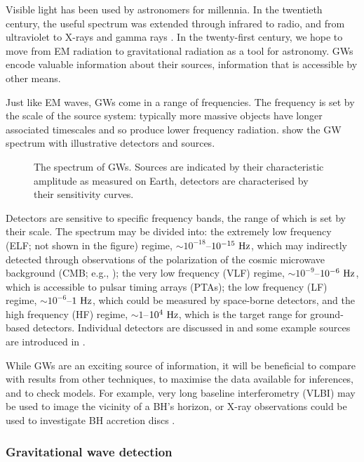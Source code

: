 Visible light has been used by astronomers for millennia. In the twentieth century, the useful spectrum was extended through infrared to radio, and from ultraviolet to X-rays and gamma rays \citep[chapter 7]{Longair2006}. In the twenty-first century, we hope to move from EM radiation to gravitational radiation as a tool for astronomy. GWs encode valuable information about their sources, information that is accessible by other means.

Just like EM waves, GWs come in a range of frequencies. The frequency is set by the scale of the source system: typically more massive objects have longer associated timescales and so produce lower frequency radiation.  show the GW spectrum with illustrative detectors and sources.
\begin{figure}
  \begin{center}
    \caption{The spectrum of GWs. Sources are indicated by their characteristic amplitude as measured on Earth, detectors are characterised by their sensitivity curves.}   
    \label{fig:spectrum} 
  \end{center}
\end{figure}
Detectors are sensitive to specific frequency bands, the range of which is set by their scale. The spectrum may be divided into: the extremely low frequency (ELF; not shown in the figure) regime, $\sim10^{-18}$--$10^{-15}~\mathrm{Hz}$, which may indirectly detected through observations of the polarization of the cosmic microwave background (CMB; e.g., \citealt{Hu1997,Kamionkowski1997}); the very low frequency (VLF) regime, $\sim10^{-9}$--$10^{-6}~\mathrm{Hz}$, which is accessible to pulsar timing arrays (PTAs); the low frequency (LF) regime, $\sim10^{-6}$--$1~\mathrm{Hz}$, which could be measured by space-borne detectors, and the high frequency (HF) regime, $\sim1$--$10^4~\mathrm{Hz}$, which is the target range for ground-based detectors. Individual detectors are discussed in  and some example sources are introduced in .

While GWs are an exciting source of information, it will be beneficial to compare with results from other techniques, to maximise the data available for inferences, and to check models. For example, very long baseline interferometry (VLBI) may be used to image the vicinity of a BH's horizon, or X-ray observations could be used to investigate BH accretion discs \cite{Psaltis2008}.

\subsubsection{Gravitational wave detection}\label{sec:GW-det}


